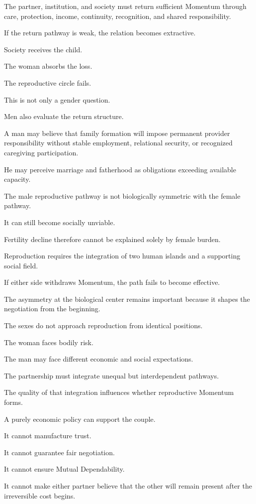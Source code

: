 The partner, institution, and society must return sufficient Momentum through care, protection, income, continuity, recognition, and shared responsibility.

If the return pathway is weak, the relation becomes extractive.

Society receives the child.

The woman absorbs the loss.

The reproductive circle fails.

This is not only a gender question.

Men also evaluate the return structure.

A man may believe that family formation will impose permanent provider responsibility without stable employment, relational security, or recognized caregiving participation.

He may perceive marriage and fatherhood as obligations exceeding available capacity.

The male reproductive pathway is not biologically symmetric with the female pathway.

It can still become socially unviable.

Fertility decline therefore cannot be explained solely by female burden.

Reproduction requires the integration of two human islands and a supporting social field.

If either side withdraws Momentum, the path fails to become effective.

The asymmetry at the biological center remains important because it shapes the negotiation from the beginning.

The sexes do not approach reproduction from identical positions.

The woman faces bodily risk.

The man may face different economic and social expectations.

The partnership must integrate unequal but interdependent pathways.

The quality of that integration influences whether reproductive Momentum forms.

A purely economic policy can support the couple.

It cannot manufacture trust.

It cannot guarantee fair negotiation.

It cannot ensure Mutual Dependability.

It cannot make either partner believe that the other will remain present after the irreversible cost begins.

